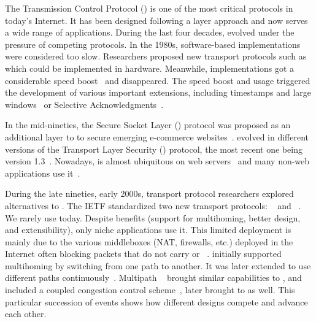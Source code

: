 The Transmission Control Protocol (\tcp) \cite{rfc793} is one of the most
critical protocols in today's Internet. It has been designed following a
layer approach and now serves a wide range of
applications. During the last four decades, \tcp evolved under
the pressure of competing protocols. In the 1980s, software-based \tcp
implementations were considered too slow. Researchers proposed new transport
protocols such as \xtp~\cite{sanders1990xpress} which could be implemented in
hardware. Meanwhile, \tcp implementations got a considerable speed
boost~\cite{clark1989analysis} and \xtp disappeared. The \tcp speed boost and
usage triggered the development of various important \tcp extensions, including
timestamps and large windows~\cite{rfc1323} or Selective
Acknowledgments~\cite{rfc2018}.

In the mid-nineties, the Secure Socket Layer (\ssl) protocol was proposed as an
additional layer to \tcp to secure emerging e-commerce
websites~\cite{draft-hickman-netscape-ssl}. \ssl evolved in different versions
of the Transport Layer Security (\tls) protocol, the most recent one being
version 1.3~\cite{rfc8446}. %
Nowadays, \tls is almost ubiquitous on web servers~\cite{holz2019era} and many
non-web applications use it~\cite{anderson2019tls}.

During the late nineties, early 2000s, transport protocol researchers explored
alternatives to \tcp. The IETF standardized two new transport protocols:
\dccp~\cite{kohler2006designing} and \sctp~\cite{rfc4960}. We rarely use \dccp
today. Despite \sctp benefits (support for multihoming, better design, and
extensibility), only niche applications use it. %
This limited deployment is mainly due to the various middleboxes (NAT,
firewalls, etc.) deployed in
the Internet often blocking packets that do not carry \tcp or
\udp~\cite{honda2011still}.  \sctp initially supported multihoming by switching
from one path to another. It was later extended to use different
paths continuously~\cite{iyengar2006concurrent}. Multipath
\tcp~\cite{rfc6824,raiciu2012hard} brought similar capabilities to \tcp, and
included a coupled congestion control scheme~\cite{wischik2011design}, later
brought to \sctp as well. This particular succession of events shows how
different designs compete and advance each other.

